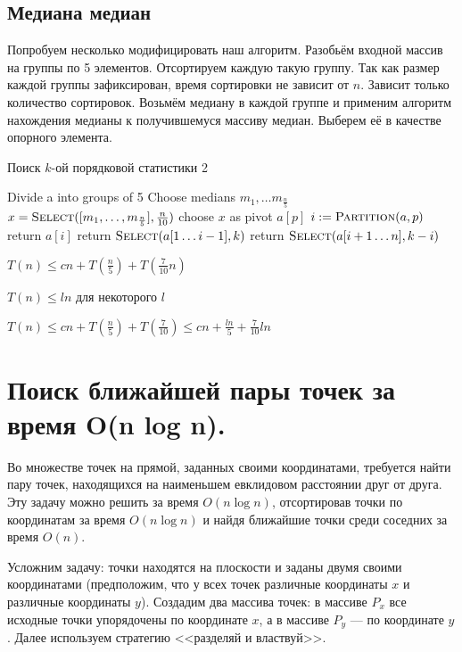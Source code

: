 \documentclass[a4paper,12pt]{article}
\begin{document}
\subsection{Медиана медиан}
Попробуем несколько модифицировать наш алгоритм.
Разобьём входной массив на группы по 5 элементов.
Отсортируем каждую такую группу.
Так как размер каждой группы зафиксирован, время сортировки не зависит от $n$.
Зависит только количество сортировок.
Возьмём медиану в каждой группе и применим алгоритм нахождения медианы к получившемуся массиву медиан.
Выберем её в качестве опорного элемента.

\begin{algorithm}
\caption{Поиск $k$-ой порядковой статистики 2}
\begin{algorithmic}[1]
	\State Divide a into groups of 5
	\State Choose medians $m_1,\ldots m_\frac{n}{5}$
	\State $x = \textsc{Select}([m_1,\ldots, m_\frac{n}{5}], \frac{n}{10})$
	\State choose $x$ as pivot $a[p]$
	\State $i \mathrel{:=} \textsc{Partition}(a, p)$
		\State return $a[i]$	
	\EndIf	
		\State return $\textsc{Select}(a[1 \ldots i - 1], k)$
	\Else
		\State return $\textsc{Select}(a[i + 1 \ldots n], k - i)$
	\EndIf
\EndFunction
\end{algorithmic}
\end{algorithm}

$T(n) \leqslant cn + T\left(\frac{n}{5}\right) + T\left( \frac{7}{10}n \right)$

$T(n) \leqslant ln$ для некоторого $l$

$T(n) \leqslant cn + T(\frac{n}{5}) + T(\frac{7}{10}) \leqslant cn + \frac{ln}{5} + \frac{7}{10}ln$
\newpage
\section{Поиск ближайшей пары точек за время O(n log n).}

Во множестве точек на прямой, заданных своими координатами, требуется найти пару точек, находящихся на наименьшем евклидовом расстоянии друг от друга. Эту задачу можно решить за время $O(n\log n)$, отсортировав точки по координатам за время $O(n\log n)$ и найдя ближайшие точки среди соседних за время $O(n)$.

Усложним задачу: точки находятся на плоскости и заданы двумя своими координатами (предположим, что у всех точек различные координаты $x$ и различные координаты $y$). Создадим два массива точек: в массиве $P_x$ все исходные точки упорядочены по координате $x$, а в массиве $P_y$ --- по координате $y$. Далее используем стратегию <<разделяй и властвуй>>.
\end{document}
